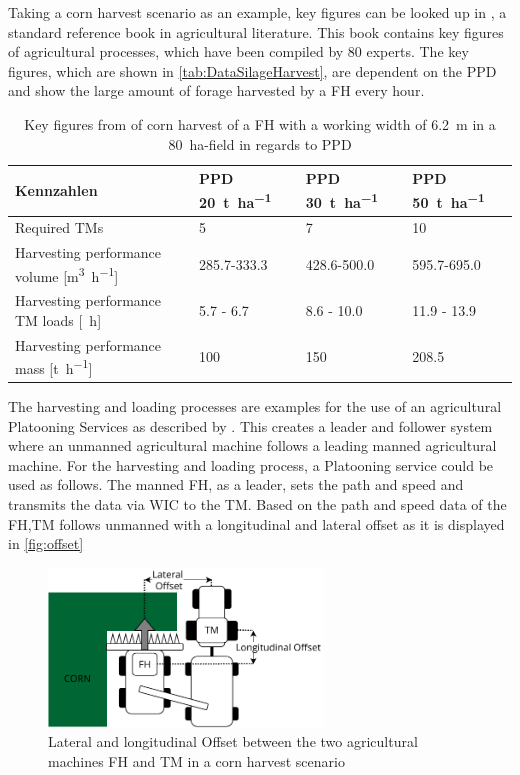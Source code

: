 \documentclass[]{nsm-thesis}
\begin{document}
Taking a corn harvest scenario as an example, key figures can be looked up in \cite{faustzahlen2018}, a standard reference book in agricultural literature. This book contains key figures of agricultural processes, which have been compiled by 80 experts. The key figures, which are shown in \autoref{tab:DataSilageHarvest}, are dependent on the \ac{PPD} and show the large amount of forage harvested by a \ac{FH} every hour.
\begin{table}
	\centering
	\begin{tabular}{>{\raggedright}p{5.5cm}p{1.6cm}p{1.6cm}p{1.6cm}}
		\toprule
		Kennzahlen & \ac{PPD} \SI{20}{\tonne\per\hectare} & \ac{PPD} \SI{30}{\tonne\per\hectare} & \ac{PPD} \SI{50}{\tonne\per\hectare}\\
		\midrule
		Required \ac{TM}s & \num{5}&
		\num{7} & \num{10} \\
		Harvesting performance volume [\si{\cubic\metre\per\hour}] &
		\num{285.7}-\num{333.3}
		& \num{428.6}-\num{500.0} &
		\num{595.7}-\num{695.0}\\
		Harvesting performance \ac{TM} loads [\si{\per\hour}] &
		\num{5.7} - \num{6.7}
		& \num{8.6} - \num{10.0} &
		\num{11.9} - \num{13.9}\\
		Harvesting performance mass [\si{\tonne\per\hour}] & \num{100}
		 & \num{150} &
		\num{208.5} \\
		\bottomrule
	\end{tabular}
	\caption{Key figures from \cite{faustzahlen2018} of corn harvest of a \ac{FH} with a working width of \SI{6.2}{\metre} in a \SI{80}{\hectare}-field in regards to \ac{PPD}}
	\label{tab:DataSilageHarvest}
\end{table}

The harvesting and loading processes are examples for the use of an agricultural Platooning Services as described by 
\textcite{zhang_method_2009}.
This creates a leader and follower system where an unmanned agricultural machine follows a leading manned agricultural machine.
For the harvesting and loading process, a Platooning service could be used as follows.
The manned \ac{FH}, as a leader, sets the path and speed and transmits the data via \ac{WIC} to the \ac{TM}. Based on the path and speed data of the \ac{FH},\ac{TM} follows unmanned with a longitudinal and lateral offset as it is displayed in \autoref{fig:offset}
\begin{figure}%
	\centering
	\includegraphics[width=0.65\textwidth]{figures/offset_platoon.pdf}
	\caption{Lateral and longitudinal Offset between the two agricultural machines \ac{FH} and \ac{TM} in a corn harvest scenario}%
	\label{fig:offset}%
\end{figure}
\end{document}
